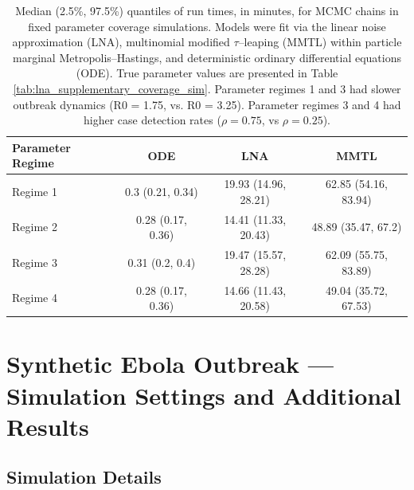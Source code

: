 \begin{table}
\begin{fullpage}
	\end{fullpage}
\end{table}

\begin{table}[htbp]
	\centering
	\begin{tabular}{lccc}
		\hline
		\textbf{Parameter Regime} & \textbf{ODE} & \textbf{LNA} & \textbf{MMTL}\\ 
		\hline
		Regime 1& 0.3 (0.21, 0.34) & 19.93 (14.96, 28.21) & 62.85 (54.16, 83.94) \\ 
		Regime 2& 0.28 (0.17, 0.36) & 14.41 (11.33, 20.43) & 48.89 (35.47, 67.2) \\ 
		Regime 3& 0.31 (0.2, 0.4) & 19.47 (15.57, 28.28) & 62.09 (55.75, 83.89) \\ 
		Regime 4& 0.28 (0.17, 0.36) & 14.66 (11.43, 20.58) & 49.04 (35.72, 67.53) \\ 
		\hline
	\end{tabular}
	\caption[Run times for fixed parameter coverage simulations.]{Median (2.5\%, 97.5\%) quantiles of run times, in minutes, for MCMC chains in fixed parameter coverage simulations. Models were fit via the linear noise approximation (LNA), multinomial modified $ \tau $--leaping (MMTL) within particle marginal Metropolis--Hastings, and deterministic ordinary differential equations (ODE). True parameter values are presented in Table \ref{tab:lna_supplementary_coverage_sim}. Parameter regimes 1 and 3 had slower outbreak dynamics (R0 = 1.75, vs. R0 = 3.25). Parameter regimes 3 and 4 had higher case detection rates ($ \rho = 0.75 $, vs $ \rho = 0.25 $).}
\end{table}
\newpage 
\section{Synthetic Ebola Outbreak --- Simulation Settings and Additional Results}
\label{sec:ebola_synth_supp}

\subsection{Simulation Details}
\label{subsec:ebola_synth_setup}

